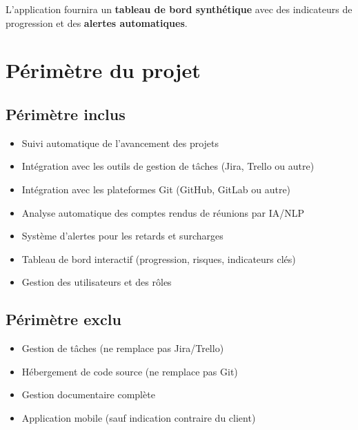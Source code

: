 \documentclass[12pt,a4paper]{article}
\begin{document}
L'application fournira un \textbf{tableau de bord synth\'etique} avec des indicateurs de progression et des \textbf{alertes automatiques}.

\section{P\'erim\`etre du projet}

\subsection{P\'erim\`etre inclus}
\begin{itemize}[leftmargin=2cm, itemsep=4pt]
    \item[\textcolor{secondary}{\checkmark}] Suivi automatique de l'avancement des projets
    \item[\textcolor{secondary}{\checkmark}] Int\'egration avec les outils de gestion de t\^aches (Jira, Trello ou autre)
    \item[\textcolor{secondary}{\checkmark}] Int\'egration avec les plateformes Git (GitHub, GitLab ou autre)
    \item[\textcolor{secondary}{\checkmark}] Analyse automatique des comptes rendus de r\'eunions par IA/NLP
    \item[\textcolor{secondary}{\checkmark}] Syst\`eme d'alertes pour les retards et surcharges
    \item[\textcolor{secondary}{\checkmark}] Tableau de bord interactif (progression, risques, indicateurs cl\'es)
    \item[\textcolor{secondary}{\checkmark}] Gestion des utilisateurs et des r\^oles
\end{itemize}

\subsection{P\'erim\`etre exclu}
\begin{itemize}[leftmargin=2cm, itemsep=4pt]
    \item[\textcolor{red!70!black}{$\times$}] Gestion de t\^aches (ne remplace pas Jira/Trello)
    \item[\textcolor{red!70!black}{$\times$}] H\'ebergement de code source (ne remplace pas Git)
    \item[\textcolor{red!70!black}{$\times$}] Gestion documentaire compl\`ete
    \item[\textcolor{red!70!black}{$\times$}] Application mobile (sauf indication contraire du client)
\end{itemize}
\end{document}
